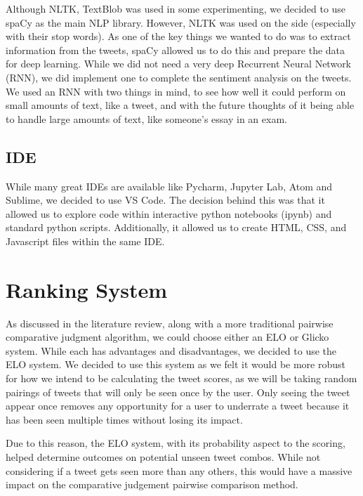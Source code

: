 	Although NLTK, TextBlob was used in some experimenting, we decided to use spaCy as the main NLP library. However, NLTK was used on the side (especially with their stop words). As one of the key things we wanted to do was to extract information from the tweets, spaCy allowed us to do this and prepare the data for deep learning. While we did not need a very deep Recurrent Neural Network (RNN), we did implement one to complete the sentiment analysis on the tweets. We used an RNN with two things in mind, to see how well it could perform on small amounts of text, like a tweet, and with the future thoughts of it being able to handle large amounts of text, like someone's essay in an exam.
	
	
	
	
	\subsection{IDE}
	While many great IDEs are available like Pycharm, Jupyter Lab, Atom and Sublime, we decided to use VS Code. The decision behind this was that it allowed us to explore code within interactive python notebooks (ipynb) and standard python scripts. Additionally, it allowed us to create HTML, CSS, and Javascript files within the same IDE.
	
	
	\section{Ranking System}
	
	As discussed in the literature review, along with a more traditional pairwise comparative judgment algorithm, we could choose either an ELO or Glicko system. While each has advantages and disadvantages, we decided to use the ELO system. We decided to use this system as we felt it would be more robust for how we intend to be calculating the tweet scores, as we will be taking random pairings of tweets that will only be seen once by the user. Only seeing the tweet appear once removes any opportunity for a user to underrate a tweet because it has been seen multiple times without losing its impact. 
	
	Due to this reason, the ELO system, with its probability aspect to the scoring, helped determine outcomes on potential unseen tweet combos. While not considering if a tweet gets seen more than any others, this would have a massive impact on the comparative judgement pairwise comparison method.
	
